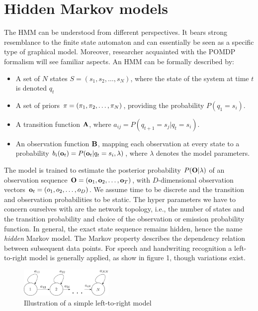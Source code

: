 \documentclass[conference]{IEEEtran}
\begin{document}
\section{Hidden Markov models}\label{secHMM}
The HMM can be understood from different perspectives. It bears strong resemblance to the finite state automaton and can essentially be seen as a specific type of graphical model. Moreover, researcher acquainted with the POMDP formalism will see familiar aspects. An HMM can be formally described by:
\begin{itemize}
 \item A set of $N$ states $S = (s_{1}, s_{2}, \ldots, s_{N})$, where the state of the system at time $t$ is denoted $q_{t}$
 \item A set of priors ${\bf \pi} = (\pi_{1}, \pi_{2}, \ldots, \pi_{N})$, providing the probability $P(q_{1} = s_{i})$.
 \item A transition function ${\bf A}$, where $a_{ij} = P(q_{t+1} = s_{j} | q_{t} = s_{i})$. 
 \item An observation function ${\bf B}$, mapping each observation at every state to a probability $b_{i}({\bf o}_{t}) = P({\bf o}_{t} | q_{t} = s_{i}, \lambda)$, where $\lambda$ denotes the model parameters.
\end{itemize}
The model is trained to estimate the posterior probability $P({\bf O}|\lambda)$ of an observation sequence ${\bf O} = ({\bf o}_{1}, {\bf o}_{2}, \ldots, {\bf o}_{T})$, with $D$-dimensional observation vectors ${\bf o}_{t} = (o_{1},o_{2},\ldots,o_{D})$. We assume time to be discrete and the transition and observation probabilities to be static. The hyper parameters we have to concern ourselves with are the network topology, i.e., the number of states and the transition probability and choice of the observation or emission probability function. In general, the exact state sequence remains hidden, hence the name {\it hidden} Markov model. The Markov property describes the dependency relation between subsequent data points. For speech and handwriting recognition a left-to-right model is generally applied, as show in figure 1, though variations exist.\\
\begin{figure}[H]
 \centering
\includegraphics[width=0.4\textwidth]{hmm.jpg}
\caption{Illustration of a simple left-to-right model}
\end{figure}
\end{document}
